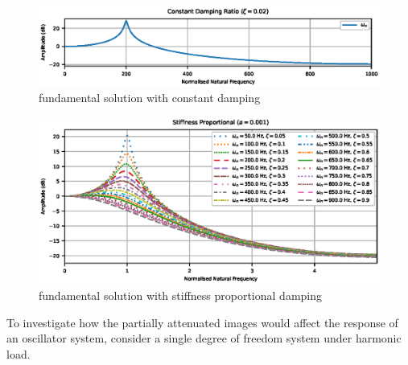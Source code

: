 \begin{figure}[ht]
\centering
\includegraphics[width=.99\linewidth]{PIC/ConstantProportional2000}
\caption{fundamental solution with constant damping}\label{fig:constant_damping}
\end{figure}

\begin{figure}[ht]
\centering
\includegraphics{PIC/StiffnessProportional100}
\caption{fundamental solution with stiffness proportional damping}\label{fig:k_proportional}
\end{figure}

To investigate how the partially attenuated images would affect the response of an oscillator system, consider a single degree of freedom system under harmonic load.